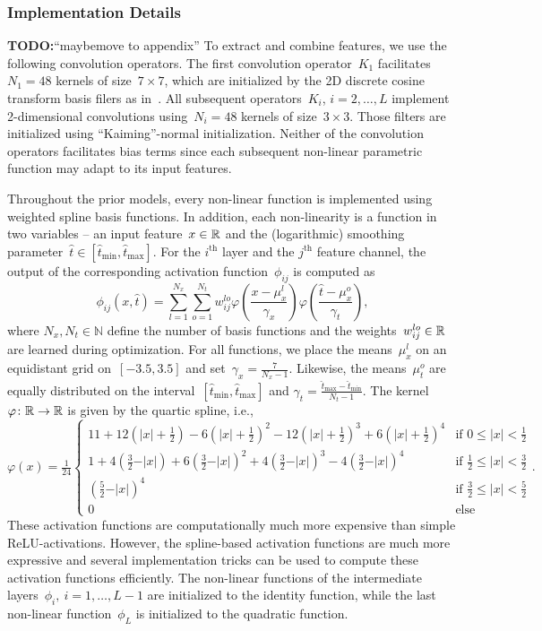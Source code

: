 \documentclass{article} %
\theoremstyle{plain}
\theoremstyle{definition}
\theoremstyle{remark}
\newcommand{\todo}[1]{{\color{red}\textbf{TODO:}``#1''}}
\newcommand{\N}{\mathbb{N}}
\def\hatt{{\widehat{t}}}
\newcommand{\tminh}{\hatt_\mathrm{min}}
\newcommand{\tmaxh}{\hatt_\mathrm{max}}
\begin{document}
\subsubsection{Implementation Details}
\todo{maybemove to appendix}
To extract and combine features, we use the following convolution operators.
The first convolution operator~$K_1$ facilitates~$N_1=48$ kernels of size~$7\times 7$, which are initialized by the 2D discrete cosine transform basis filers as in~\citet{ChPo16,KoKl17}.
All subsequent operators~$K_i$, $i=2,\ldots,L$ implement 2-dimensional convolutions using~$N_i=48$ kernels of size~$3\times 3$.
Those filters are initialized using ``Kaiming''-normal initialization.
Neither of the convolution operators facilitates bias terms since each subsequent non-linear parametric function may adapt to its input features.

Throughout the prior models, every non-linear function is implemented using weighted spline basis functions.
In addition, each non-linearity is a function in two variables -- an input feature~$x\in\mathbb{R}$ and the (logarithmic) smoothing parameter~$\widehat{t}\in[\tminh,\tmaxh]$.
For the $i^\text{th}$ layer and the $j^\text{th}$ feature channel, the output of the corresponding activation function~$\phi_{ij}$ is computed as
\[
\phi_{ij}(x,\widehat{t}) = \sum_{l=1}^{N_x}\sum_{o=1}^{N_t} w_{ij}^{lo} \varphi\left(\frac{x-\mu_x^l}{\gamma_x}\right) \varphi\left(\frac{\widehat{t}-\mu_x^o}{\gamma_t}\right),
\]
where $N_x,N_t\in\N$ define the number of basis functions and the weights~$w_{ij}^{lo}\in\mathbb{R}$ are learned during optimization.
For all functions, we place the means~$\mu_x^l$ on an equidistant grid on~$[-3.5,3.5]$ and set~$\gamma_x=\frac{7}{N_x-1}$.
Likewise, the means~$\mu_t^o$ are equally distributed on the interval~$[\tminh,\tmaxh]$ and $\gamma_t=\frac{\tmaxh-\tminh}{N_t-1}$.
The kernel~$\varphi\colon\mathbb{R}\to\mathbb{R}$ is given by the quartic spline, i.e.,
\[
\varphi(x)=\tfrac{1}{24}
\begin{cases}
11 + 12(\vert x\vert+\frac12) - 6(\vert x\vert+\frac12)^2 - 12(\vert x\vert+\frac12)^3 + 6(\vert x\vert+\frac12)^4 &\text{if } 0\leq\vert x\vert< \frac12\\
1 + 4(\frac32-\vert x\vert) + 6(\frac32-\vert x\vert)^2 + 4(\frac32-\vert x\vert)^3 - 4(\frac32-\vert x\vert)^4 &\text{if } \frac12\leq \vert x\vert< \frac32\\
(\frac52-\vert x\vert)^4 &\text{if } \frac32\leq \vert x\vert<\frac52\\
0 &\text{else}
\end{cases}.
\]
These activation functions are computationally much more expensive than simple ReLU-activations.
However, the spline-based activation functions are much more expressive and several implementation tricks can be used to compute these activation functions efficiently.
The non-linear functions of the intermediate layers~$\phi_i,\ i=1,\ldots,L-1$ are initialized to the identity function, while the last non-linear function~$\phi_L$ is initialized to the quadratic function.
\end{document}
